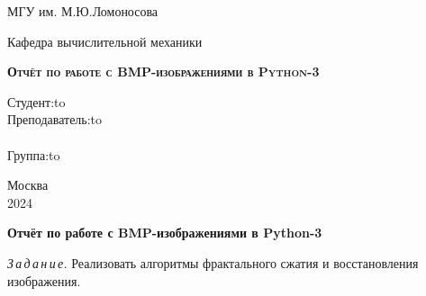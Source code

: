 \documentclass{article}
\begin{document}
\begin{titlepage}
\newpage

\begin{center}
МГУ им. М.Ю.Ломоносова \\
\end{center}

\vspace{8em}

\begin{center}
\Large Кафедра вычислительной механики \\ 
\end{center}

\vspace{2em}

\begin{center}
\textsc{\textbf{Отчёт по работе с BMP-изображениями в Python-3 \linebreak}}
\end{center}

\vspace{15em}



\newbox{\lbox}
\newlength{\maxl}
\setlength{\maxl}{\wd\lbox}
\hfill\parbox{12cm}{
\hspace*{8cm}\hspace*{-5cm}Студент:\hfill\hbox to\\
\hspace*{8cm}\hspace*{-5cm}Преподаватель:\hfill\hbox to\\
\\
\hspace*{8cm}\hspace*{-5cm}Группа:\hfill\hbox to\\
}


\vspace{\fill}

\begin{center}
Москва \\2024
\end{center}

\end{titlepage}

\begin{center}


{\large\bf Отчёт по работе с BMP-изображениями в Python-3}
\end{center}
\textit{З\,а\,д\,а\,н\,и\,е.} Реализовать алгоритмы фрактального сжатия и восстановления изображения.
\end{document}

